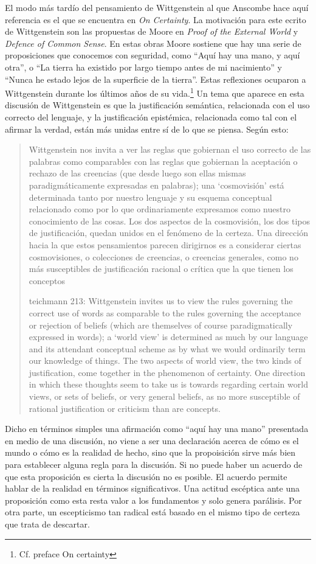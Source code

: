 El modo más tardío del pensamiento de Wittgenstein al que Anscombe hace aquí referencia es el que se encuentra en \emph{On Certainty}. La motivación para este ecrito de Wittgenstein son las propuestas de Moore en \emph{Proof of the External World} y \emph{Defence of Common Sense}. En estas obras Moore sostiene que hay una serie de proposiciones que conocemos con seguridad, como \enquote{Aquí hay una mano, y aquí otra}, o \enquote{La tierra ha existido por largo tiempo antes de mi nacimiento} y \enquote{Nunca he estado lejos de la superficie de la tierra}. Estas reflexiones ocuparon a Wittgenstein durante los últimos años de su vida.\footnote{Cf. preface On certainty} Un tema que aparece en esta discusión de Wittgenstein es que la justificación semántica, relacionada con el uso correcto del lenguaje, y la justificación epistémica, relacionada como tal con el afirmar la verdad, están más unidas entre sí de lo que se piensa. Según esto:\blockquote[teichmann 213: Wittgenstein invites us to view the rules governing the correct use of words as comparable to the rules governing the acceptance or rejection of beliefs (which are themselves of course paradigmatically expressed in words); a ‘world view’ is determined as much by our language and its attendant conceptual scheme as by what we would ordinarily term our knowledge of things. The two aspects of world view, the two kinds of justification, come together in the phenomenon of certainty. \textelp{} One direction in which these thoughts seem to take us is towards regarding certain world views, or sets of beliefs, or very general beliefs, as no more susceptible of rational justification or criticism than are concepts.]{Wittgenstein nos invita a ver las reglas que gobiernan el uso correcto de las palabras como comparables con las reglas que gobiernan la aceptación o rechazo de las creencias (que desde luego son ellas mismas paradigmáticamente expresadas en palabras); una `cosmovisión' está determinada tanto por nuestro lenguaje y su esquema conceptual relacionado como por lo que ordinariamente expresamos como nuestro conocimiento de las cosas. Los dos aspectos de la cosmovisión, los dos tipos de justificación, quedan unidos en el fenómeno de la certeza. \textelp{} Una dirección hacia la que estos pensamientos parecen dirigirnos es a considerar ciertas cosmovisiones, o colecciones de creencias, o creencias generales, como no más susceptibles de justificación racional o crítica que la que tienen los conceptos}. Dicho en términos simples una afirmación como \enquote{aquí hay una mano} presentada en medio de una discusión, no viene a ser una declaración acerca de cómo es el mundo o cómo es la realidad de hecho, sino que la propoisición sirve más bien para establecer alguna regla para la discusión. Si no puede haber un acuerdo de que esta proposición es cierta la discusión no es posible. El acuerdo permite hablar de la realidad en términos significativos. Una actitud escéptica ante una proposición como esta resta valor a los fundamentos y solo genera parálisis. Por otra parte, un escepticismo tan radical está basado en el mismo tipo de certeza que trata de descartar.

